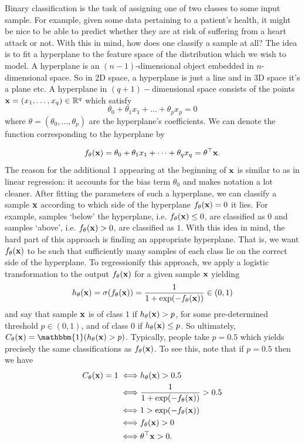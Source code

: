 \documentclass[11pt]{article}
\begin{document}
Binary classification is the task of assigning one of two classes to some input sample. For example, given some data pertaining to a patient's health, it might be nice to be able to predict whether they are at risk of suffering from a heart attack or not. With this in mind, how does one classify a sample at all? The idea is to fit a hyperplane to the feature space of the distribution which we wish to model. A hyperplane is an $(n-1)$-dimensional object embedded in $n$-dimensional space. So in 2D space, a hyperplane is just a line and in 3D space it's a plane etc. A hyperplane in $(q+1)-$dimensional space consists of the points $\mathbf{x}=(x_1,\dots,x_q)\in\mathbb{R}^q$ which satisfy
$$
\theta_0+\theta_1x_1+\dots+\theta_px_p
=
0
$$
where $\theta=(\theta_0,\dots,\theta_p)$ are the hyperplane's coefficients. We can denote the function corresponding to the hyperplane by

$$
f_{\theta}(\mathbf{x})
=
\theta_0+\theta_1x_1+\dots+\theta_qx_q
=
\theta^\top \mathbf{x}.
$$
The reason for the additional $1$ appearing at the beginning of $\mathbf{x}$ is similar to as in linear regression: it accounts for the bias term $\theta_0$ and makes notation a lot cleaner. After fitting the parameters of such a hyperplane, we can classify a sample $\mathbf{x}$ according to which side of the hyperplane $f_{\theta}(\mathbf{x})=0$ it lies. For example, samples `below' the hyperplane, i.e. $f_{\theta}(\mathbf{x})\leq0$, are classified as $0$ and samples `above', i.e. $f_{\theta}(\mathbf{x})>0$, are classified as $1$. With this idea in mind, the hard part of this approach is finding an appropriate hyperplane. That is, we want $f_{\theta}(\mathbf{x})$ to be such that sufficiently many samples of each class lie on the correct side of the hyperplane. To regressionify this approach, we apply a logistic transformation to the output $f_{\theta}(\mathbf{x})$ for a given sample $\mathbf{x}$ yielding
$$
h_{\theta}(\mathbf{x})
=
\sigma(f_{\theta}(\mathbf{x}))
=
\frac{1}{1+\exp(-f_{\theta}(\mathbf{x}))}\in(0,1)
$$
and say that sample $\mathbf{x}$ is of class $1$ if $h_{\theta}(\mathbf{x})>p$, for some pre-determined threshold $p\in(0,1)$, and of class $0$ if $h_{\theta}(\mathbf{x})\leq p$. So ultimately, $C_{\theta}(\x)=\mathbbm{1}(h_{\theta}(\x)>p)$. Typically, people take $p=0.5$ which yields precisely the same classifications as $f_{\theta}(\mathbf{x})$. To see this, note that if $p=0.5$ then we have
\begin{align*}
    C_{\theta}(\mathbf{x})=1
    \iff & h_{\theta}(\mathbf{x})>0.5\\
    \iff & \frac{1}{1+\exp(-f_{\theta}(\mathbf{x}))}>0.5\\
    \iff & 1 > \exp(-f_{\theta}(\mathbf{x}))\\
    \iff & f_{\theta}(\mathbf{x}) > 0\\
    \iff & \theta^{\top}\mathbf{x} > 0.
\end{align*}
\end{document}
